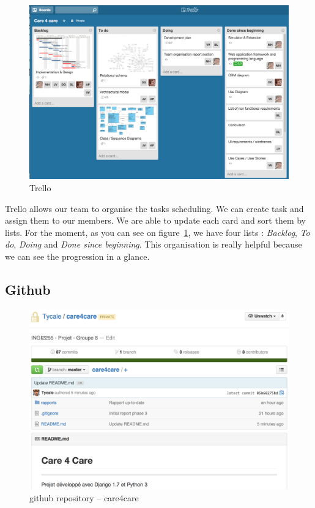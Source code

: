 \documentclass[11pt, a4paper]{article}   	%
\newcommand{\tit}[1]{\textit{#1}}
\begin{document}
\begin{figure}[!ht]
   \includegraphics[width=\textwidth]{trello.png}
   \caption{\label{trello} Trello}
\end{figure}

Trello allows our team to organise the tasks scheduling.
We can create task and assign them to our members.
We are able to update each card and sort them by lists.
For the moment, as you can see on figure~\ref{trello}, we have four lists : \tit{Backlog}, \tit{To do}, \tit{Doing} and \tit{Done since beginning}.
This organisation is really helpful because we can see the progression in a glance.

\subsection{Github}

\begin{figure}[!ht]
   \includegraphics[width=\textwidth]{github.png}
   \caption{\label{github} github repository – care4care}
\end{figure}
\end{document}
